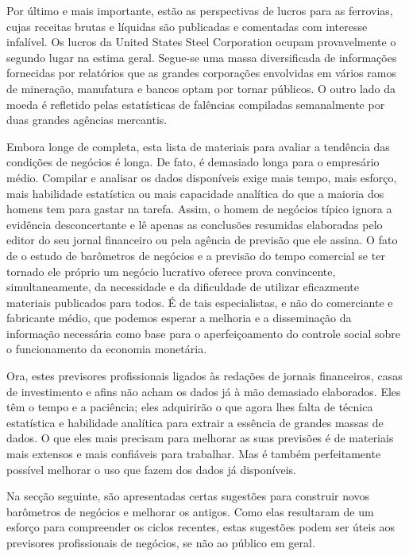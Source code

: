 \documentclass[12pt]{article}
\begin{document}
Por último e mais importante, estão as perspectivas de lucros para as ferrovias, cujas receitas brutas e líquidas são publicadas e comentadas com interesse infalível. Os lucros da United States Steel Corporation ocupam provavelmente o segundo lugar na estima geral. Segue-se uma massa diversificada de informações fornecidas por relatórios que as grandes corporações envolvidas em vários ramos de mineração, manufatura e bancos optam por tornar públicos. O outro lado da moeda é refletido pelas estatísticas de falências compiladas semanalmente por duas grandes agências mercantis.

Embora longe de completa, esta lista de materiais para avaliar a tendência das condições de negócios é longa. De fato, é demasiado longa para o empresário médio. Compilar e analisar os dados disponíveis exige mais tempo, mais esforço, mais habilidade estatística ou mais capacidade analítica do que a maioria dos homens tem para gastar na tarefa. Assim, o homem de negócios típico ignora a evidência desconcertante e lê apenas as conclusões resumidas elaboradas pelo editor do seu jornal financeiro ou pela agência de previsão que ele assina. O fato de o estudo de barômetros de negócios e a previsão do tempo comercial se ter tornado ele próprio um negócio lucrativo oferece prova convincente, simultaneamente, da necessidade e da dificuldade de utilizar eficazmente materiais publicados para todos. É de tais especialistas, e não do comerciante e fabricante médio, que podemos esperar a melhoria e a disseminação da informação necessária como base para o aperfeiçoamento do controle social sobre o funcionamento da economia monetária.

Ora, estes previsores profissionais ligados às redações de jornais financeiros, casas de investimento e afins não acham os dados já à mão demasiado elaborados. Eles têm o tempo e a paciência; eles adquirirão o que agora lhes falta de técnica estatística e habilidade analítica para extrair a essência de grandes massas de dados. O que eles mais precisam para melhorar as suas previsões é de materiais mais extensos e mais confiáveis para trabalhar. Mas é também perfeitamente possível melhorar o uso que fazem dos dados já disponíveis.

Na secção seguinte, são apresentadas certas sugestões para construir novos barômetros de negócios e melhorar os antigos. Como elas resultaram de um esforço para compreender os ciclos recentes, estas sugestões podem ser úteis aos previsores profissionais de negócios, se não ao público em geral.
\end{document}

